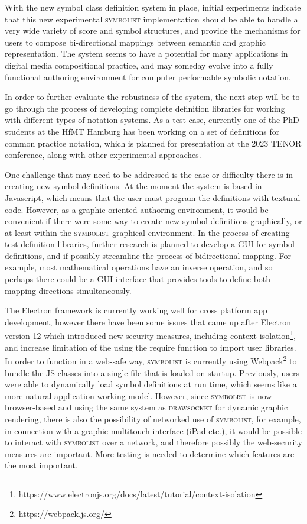 \documentclass{article}
\def\symbolist{\textsc{symbolist}\xspace}
\def\drawsocket{\textsc{drawsocket}\xspace}
\begin{document}
With the new symbol class definition system in place, initial experiments indicate that this new experimental \symbolist implementation should be able to handle a very wide variety of score and symbol structures, and provide the mechanisms for users to compose bi-directional mappings between semantic and graphic representation.
The system seems to have a potential for many applications in digital media compositional practice, and may someday evolve into a fully functional authoring environment for computer performable symbolic notation.

In order to further evaluate the robustness of the system, the next step will be to go through the process of developing complete definition libraries for working with different types of notation systems. As a test case, currently one of the PhD students at the HfMT Hamburg has been working on a set of definitions for common practice notation, which is planned for presentation at the 2023 TENOR conference, along with other experimental approaches.

One challenge that may need to be addressed is the ease or difficulty there is in creating new symbol definitions. At the moment the system is based in Javascript, which means that the user must program the definitions with textural code. However, as a graphic oriented authoring environment, it would be convenient if there were some way to create new symbol definitions graphically, or at least within the \symbolist graphical environment. 
In the process of creating test definition libraries, further research is planned to develop a GUI for symbol definitions, and if possibly streamline the process of bidirectional mapping. For example, most mathematical operations have an inverse operation, and so perhaps there could be a GUI interface that provides tools to define both mapping directions simultaneously.

The Electron framework is currently working well for cross platform app development, however there have been some issues that came up after Electron version 12 which introduced new security measures, including context isolation\footnote{https://www.electronjs.org/docs/latest/tutorial/context-isolation}, and increase limitation of the using the require function to import user libraries. In order to function in a web-safe way, \symbolist is currently using Webpack\footnote{https://webpack.js.org/} to bundle the JS classes into a single file that is loaded on startup. Previously, users were able to dynamically load symbol definitions at run time, which seems like a more natural application working model. 
However, since \symbolist is now browser-based and using the same system as \drawsocket for dynamic graphic rendering, there is also the possibility of networked use of \symbolist, for example, in connection with a graphic multitouch interface (iPad etc.), it would be possible to interact with \symbolist over a network, and therefore possibly the web-security measures are important. 
More testing is needed to determine which features are the most important.
\end{document}
